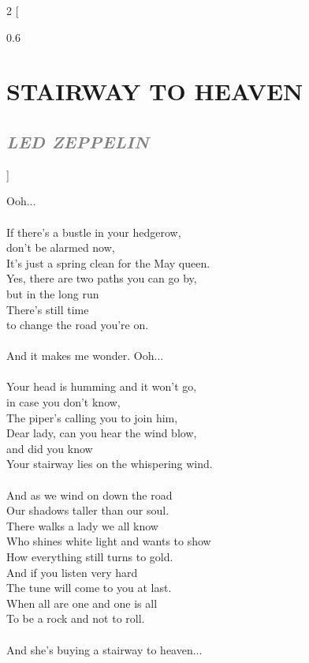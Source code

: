 \documentclass[100pt,a4paper]{report}
\newenvironment{song2}[2]
	{	
    	\begin{multicols*}{2}
		[
			\begin{spacing}{0.6}
				\section*{\LARGE\centering \MakeUppercase{\textbf{{#1}}}}
				\subsection*{\Large\centering \textit{\textcolor{gray}{\MakeUppercase{{#2}}}}}
			\end{spacing}
		]
		\Large
	}
	{
	\end{multicols*}
	\newpage
    }
\begin{document}
\begin{song2}{Stairway To Heaven}{Led Zeppelin}
Ooh...\\
\\
If there's a bustle in your hedgerow,\\ 
don't be alarmed now,\\
It's just a spring clean for the May queen.\\
Yes, there are two paths you can go by,\\
but in the long run\\
There's still time\\
to change the road you're on.\\
\\
And it makes me wonder. Ooh...\\
\\
Your head is humming and it won't go,\\
in case you don't know,\\
The piper's calling you to join him,\\
Dear lady, can you hear the wind blow,\\
and did you know\\
Your stairway lies on the whispering wind.\\
\\
And as we wind on down the road\\
Our shadows taller than our soul.\\
There walks a lady we all know\\
Who shines white light and wants to show\\
How everything still turns to gold.\\
And if you listen very hard\\
The tune will come to you at last.\\
When all are one and one is all\\
To be a rock and not to roll.\\
\\
And she's buying a stairway to heaven... 
\end{song2}
\end{document}
